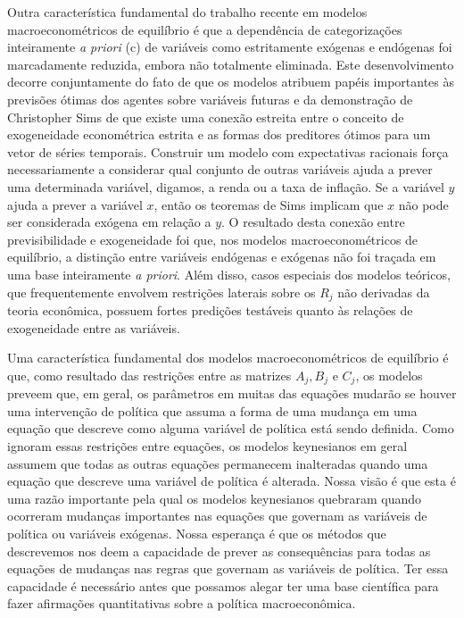 \documentclass[12pt]{article}
\begin{document}
Outra característica fundamental do trabalho recente em modelos macroeconométricos de equilíbrio é que a dependência de categorizações inteiramente \textit{a priori} (c) de variáveis como estritamente exógenas e endógenas foi marcadamente reduzida, embora não totalmente eliminada. Este desenvolvimento decorre conjuntamente do fato de que os modelos atribuem papéis importantes às previsões ótimas dos agentes sobre variáveis futuras e da demonstração de Christopher Sims de que existe uma conexão estreita entre o conceito de exogeneidade econométrica estrita e as formas dos preditores ótimos para um vetor de séries temporais. Construir um modelo com expectativas racionais força necessariamente a considerar qual conjunto de outras variáveis ajuda a prever uma determinada variável, digamos, a renda ou a taxa de inflação. Se a variável $y$ ajuda a prever a variável $x$, então os teoremas de Sims implicam que $x$ não pode ser considerada exógena em relação a $y$. O resultado desta conexão entre previsibilidade e exogeneidade foi que, nos modelos macroeconométricos de equilíbrio, a distinção entre variáveis endógenas e exógenas não foi traçada em uma base inteiramente \textit{a priori}. Além disso, casos especiais dos modelos teóricos, que frequentemente envolvem restrições laterais sobre os $R_j$ não derivadas da teoria econômica, possuem fortes predições testáveis quanto às relações de exogeneidade entre as variáveis.

Uma característica fundamental dos modelos macroeconométricos de equilíbrio é que, como resultado das restrições entre as matrizes $A_j, B_j$ e $C_j$, os modelos preveem que, em geral, os parâmetros em muitas das equações mudarão se houver uma intervenção de política que assuma a forma de uma mudança em uma equação que descreve como alguma variável de política está sendo definida. Como ignoram essas restrições entre equações, os modelos keynesianos em geral assumem que todas as outras equações permanecem inalteradas quando uma equação que descreve uma variável de política é alterada. Nossa visão é que esta é uma razão importante pela qual os modelos keynesianos quebraram quando ocorreram mudanças importantes nas equações que governam as variáveis de política ou variáveis exógenas. Nossa esperança é que os métodos que descrevemos nos deem a capacidade de prever as consequências para todas as equações de mudanças nas regras que governam as variáveis de política. Ter essa capacidade é necessário antes que possamos alegar ter uma base científica para fazer afirmações quantitativas sobre a política macroeconômica.
\end{document}
